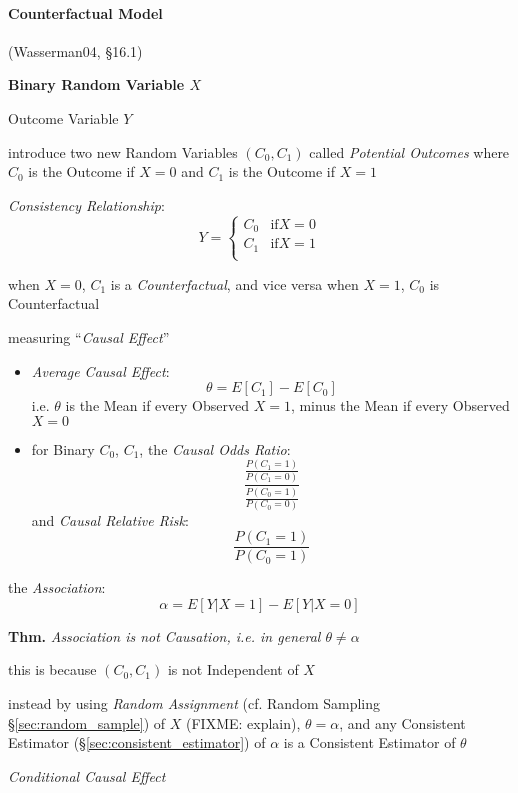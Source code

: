 \paragraph{Counterfactual Model}\label{sec:counterfactual}\hfill

(Wasserman04, \S16.1)

\textbf{Binary Random Variable $X$}

Outcome Variable $Y$

introduce two new Random Variables $(C_0, C_1)$ called \emph{Potential Outcomes}
where $C_0$ is the Outcome if $X = 0$ and $C_1$ is the Outcome if $X = 1$

\emph{Consistency Relationship}:
\[
  Y = \begin{cases}
    C_0 & \text{if} X = 0 \\
    C_1 & \text{if} X = 1 \\
  \end{cases}
\]

when $X = 0$, $C_1$ is a \emph{Counterfactual}, and vice versa when $X = 1$,
$C_0$ is Counterfactual

measuring ``\emph{Causal Effect}''

\begin{itemize}
  \item \emph{Average Causal Effect}:
    \[
      \theta = E[C_1] - E[C_0]
    \]
    i.e. $\theta$ is the Mean if every Observed $X = 1$, minus the Mean if every
    Observed $X = 0$

  \item for Binary $C_0$, $C_1$, the \emph{Causal Odds Ratio}:
    \[
      \frac{
        \frac{P(C_1 = 1)}{P(C_1 = 0)}
      }{
        \frac{P(C_0 = 1)}{P(C_0 = 0)}
      }
    \]
    and \emph{Causal Relative Risk}:
    \[
      \frac{P(C_1 = 1)}{P(C_0 = 1)}
    \]
\end{itemize}

the \emph{Association}:
\[
  \alpha = E[Y | X = 1] - E[Y | X = 0]
\]

\textbf{Thm.} \emph{Association is not Causation, i.e. in general
$\theta \neq \alpha$}

this is because $(C_0, C_1)$ is not Independent of $X$

instead by using \emph{Random Assignment} (cf. Random Sampling
\S\ref{sec:random_sample}) of $X$ (FIXME: explain), $\theta = \alpha$, and any
Consistent Estimator (\S\ref{sec:consistent_estimator}) of $\alpha$ is a
Consistent Estimator of $\theta$

\emph{Conditional Causal Effect}


